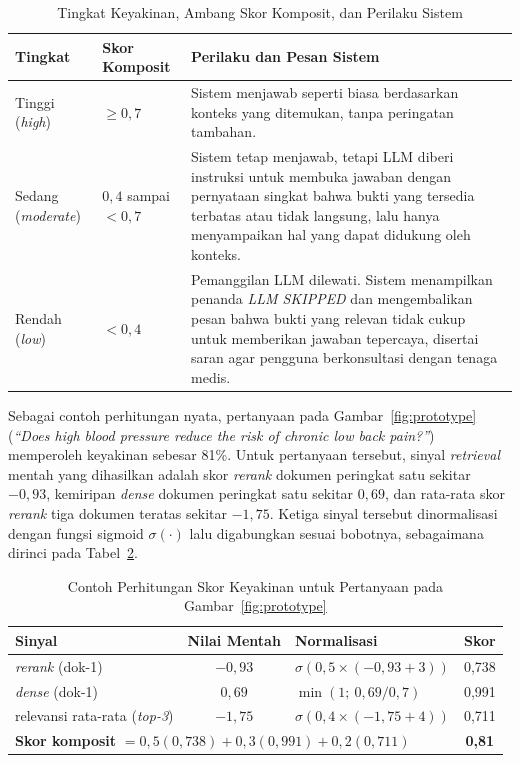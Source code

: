 \begin{table}[H]
\centering
\small
\setlength{\tabcolsep}{4pt}
\caption{Tingkat Keyakinan, Ambang Skor Komposit, dan Perilaku Sistem}
\label{tbl:guardrail-threshold}
\begin{tabular}{|p{2.5cm}|p{2.2cm}|p{8.1cm}|}
\hline
\textbf{Tingkat} & \textbf{Skor Komposit} & \textbf{Perilaku dan Pesan Sistem} \\ \hline
Tinggi (\textit{high}) & $\geq 0{,}7$ & Sistem menjawab seperti biasa berdasarkan konteks yang ditemukan, tanpa peringatan tambahan. \\ \hline
Sedang (\textit{moderate}) & $0{,}4$ sampai $< 0{,}7$ & Sistem tetap menjawab, tetapi LLM diberi instruksi untuk membuka jawaban dengan pernyataan singkat bahwa bukti yang tersedia terbatas atau tidak langsung, lalu hanya menyampaikan hal yang dapat didukung oleh konteks. \\ \hline
Rendah (\textit{low}) & $< 0{,}4$ & Pemanggilan LLM dilewati. Sistem menampilkan penanda \textit{LLM SKIPPED} dan mengembalikan pesan bahwa bukti yang relevan tidak cukup untuk memberikan jawaban tepercaya, disertai saran agar pengguna berkonsultasi dengan tenaga medis. \\ \hline
\end{tabular}
\end{table}

Sebagai contoh perhitungan nyata, pertanyaan pada Gambar~\ref{fig:prototype} (\textit{``Does high blood pressure reduce the risk of chronic low back pain?''}) memperoleh keyakinan sebesar 81\%. Untuk pertanyaan tersebut, sinyal \textit{retrieval} mentah yang dihasilkan adalah skor \textit{rerank} dokumen peringkat satu sekitar $-0{,}93$, kemiripan \textit{dense} dokumen peringkat satu sekitar $0{,}69$, dan rata-rata skor \textit{rerank} tiga dokumen teratas sekitar $-1{,}75$. Ketiga sinyal tersebut dinormalisasi dengan fungsi sigmoid $\sigma(\cdot)$ lalu digabungkan sesuai bobotnya, sebagaimana dirinci pada Tabel~\ref{tbl:confidence-contoh}.

\begin{table}[H]
\centering
\small
\setlength{\tabcolsep}{6pt}
\caption{Contoh Perhitungan Skor Keyakinan untuk Pertanyaan pada Gambar~\ref{fig:prototype}}
\label{tbl:confidence-contoh}
\begin{tabular}{l c l c}
\toprule
\textbf{Sinyal} & \textbf{Nilai Mentah} & \textbf{Normalisasi} & \textbf{Skor} \\
\midrule
\textit{rerank} (dok-1)   & $-0{,}93$ & $\sigma(0{,}5 \times (-0{,}93 + 3))$ & 0{,}738 \\
\textit{dense} (dok-1)    & $0{,}69$  & $\min(1;\ 0{,}69 / 0{,}7)$          & 0{,}991 \\
relevansi rata-rata (\textit{top-3}) & $-1{,}75$ & $\sigma(0{,}4 \times (-1{,}75 + 4))$ & 0{,}711 \\
\midrule
\multicolumn{3}{l}{\textbf{Skor komposit} $= 0{,}5(0{,}738) + 0{,}3(0{,}991) + 0{,}2(0{,}711)$} & \textbf{0{,}81} \\
\bottomrule
\end{tabular}
\end{table}

